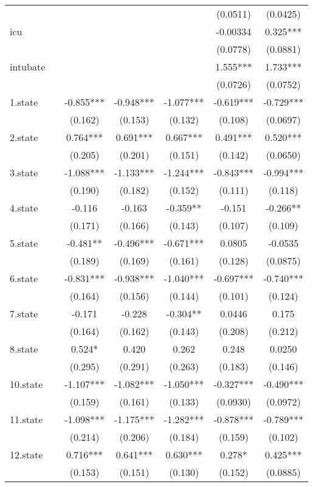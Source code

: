 \documentclass[]{article}
\begin{document}
\begin{tabular}{lcccccc}
 &  &  &  &  & (0.0511) & (0.0425) \\
icu &  &  &  &  & -0.00334 & 0.325*** \\
 &  &  &  &  & (0.0778) & (0.0881) \\
intubate &  &  &  &  & 1.555*** & 1.733*** \\
 &  &  &  &  & (0.0726) & (0.0752) \\
1.state &  & -0.855*** & -0.948*** & -1.077*** & -0.619*** & -0.729*** \\
 &  & (0.162) & (0.153) & (0.132) & (0.108) & (0.0697) \\
2.state &  & 0.764*** & 0.691*** & 0.667*** & 0.491*** & 0.520*** \\
 &  & (0.205) & (0.201) & (0.151) & (0.142) & (0.0650) \\
3.state &  & -1.088*** & -1.133*** & -1.244*** & -0.843*** & -0.994*** \\
 &  & (0.190) & (0.182) & (0.152) & (0.111) & (0.118) \\
4.state &  & -0.116 & -0.163 & -0.359** & -0.151 & -0.266** \\
 &  & (0.171) & (0.166) & (0.143) & (0.107) & (0.109) \\
5.state &  & -0.481** & -0.496*** & -0.671*** & 0.0805 & -0.0535 \\
 &  & (0.189) & (0.169) & (0.161) & (0.128) & (0.0875) \\
6.state &  & -0.831*** & -0.938*** & -1.040*** & -0.697*** & -0.740*** \\
 &  & (0.164) & (0.156) & (0.144) & (0.101) & (0.124) \\
7.state &  & -0.171 & -0.228 & -0.304** & 0.0446 & 0.175 \\
 &  & (0.164) & (0.162) & (0.143) & (0.208) & (0.212) \\
8.state &  & 0.524* & 0.420 & 0.262 & 0.248 & 0.0250 \\
 &  & (0.295) & (0.291) & (0.263) & (0.183) & (0.146) \\
10.state &  & -1.107*** & -1.082*** & -1.050*** & -0.327*** & -0.490*** \\
 &  & (0.159) & (0.161) & (0.133) & (0.0930) & (0.0972) \\
11.state &  & -1.098*** & -1.175*** & -1.282*** & -0.878*** & -0.789*** \\
 &  & (0.214) & (0.206) & (0.184) & (0.159) & (0.102) \\
12.state &  & 0.716*** & 0.641*** & 0.630*** & 0.278* & 0.425*** \\
 &  & (0.153) & (0.151) & (0.130) & (0.152) & (0.0885) \\

\end{tabular}
\end{document}
